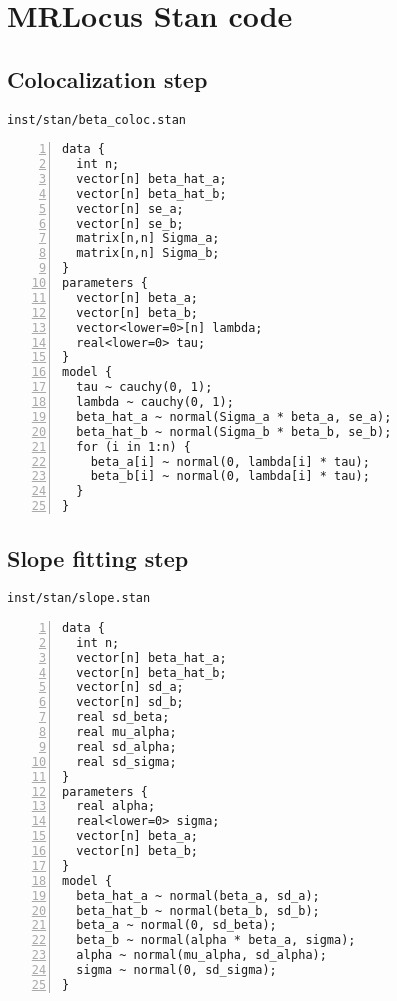 \documentclass[11pt]{article}
\begin{document}
\newpage

\section{MRLocus Stan code}

\subsection{Colocalization step}

\texttt{inst/stan/beta\_coloc.stan}

\begin{Verbatim}[frame=single,numbers=left]
data {
  int n;
  vector[n] beta_hat_a;
  vector[n] beta_hat_b;
  vector[n] se_a;
  vector[n] se_b;
  matrix[n,n] Sigma_a;
  matrix[n,n] Sigma_b;
}
parameters {
  vector[n] beta_a;
  vector[n] beta_b;
  vector<lower=0>[n] lambda;
  real<lower=0> tau;
}
model {
  tau ~ cauchy(0, 1);
  lambda ~ cauchy(0, 1);
  beta_hat_a ~ normal(Sigma_a * beta_a, se_a);
  beta_hat_b ~ normal(Sigma_b * beta_b, se_b);
  for (i in 1:n) {
    beta_a[i] ~ normal(0, lambda[i] * tau);
    beta_b[i] ~ normal(0, lambda[i] * tau);
  }
}
\end{Verbatim}

\newpage

\subsection{Slope fitting step}

\texttt{inst/stan/slope.stan}

\begin{Verbatim}[frame=single,numbers=left]
data {
  int n; 
  vector[n] beta_hat_a;
  vector[n] beta_hat_b;
  vector[n] sd_a;
  vector[n] sd_b;
  real sd_beta;
  real mu_alpha;
  real sd_alpha;
  real sd_sigma;
}
parameters {
  real alpha;
  real<lower=0> sigma;
  vector[n] beta_a;
  vector[n] beta_b;
}
model {
  beta_hat_a ~ normal(beta_a, sd_a);
  beta_hat_b ~ normal(beta_b, sd_b);
  beta_a ~ normal(0, sd_beta);
  beta_b ~ normal(alpha * beta_a, sigma);
  alpha ~ normal(mu_alpha, sd_alpha);
  sigma ~ normal(0, sd_sigma);
}
\end{Verbatim}

\newpage


\end{document}
